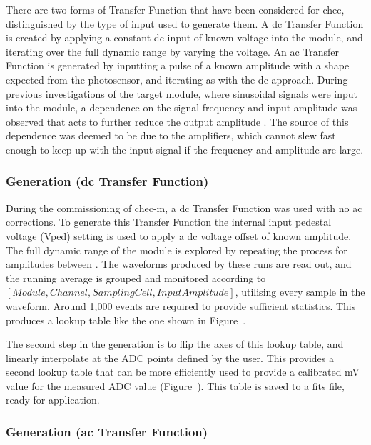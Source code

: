 There are two forms of Transfer Function that have been considered for \gls{chec}, distinguished by the type of input used to generate them. A \gls{dc} Transfer Function is created by applying a constant \gls{dc} input of known voltage into the module, and iterating over the full dynamic range by varying the voltage. An \gls{ac} Transfer Function is generated by inputting a pulse of a known amplitude with a shape expected from the photosensor, and iterating as with the \gls{dc} approach. During previous  investigations of the \gls{target} module, where sinusoidal signals were input into the module, a dependence on the signal frequency and input amplitude was observed that acts to further reduce the output amplitude \cite{Bechtol2012}\cite{Albert2017}. The source of this dependence was deemed to be due to the amplifiers, which cannot slew fast enough to keep up with the input
signal if the frequency and amplitude are large. 

\subsubsection{Generation (\gls{dc} Transfer Function)}

During the commissioning of \gls{chec-m}, a \gls{dc} Transfer Function was used with no \gls{ac} corrections. To generate this Transfer Function the internal input pedestal voltage (Vped) setting is used to apply a \gls{dc} voltage offset of known amplitude. The full dynamic range of the module is explored by repeating the process for amplitudes between . The waveforms produced by these runs are read out, and the running average is grouped and monitored according to $[Module, Channel, Sampling Cell, Input Amplitude]$, utilising every sample in the waveform. Around 1,000 events are required to provide sufficient statistics. This produces a lookup table like the one shown in Figure~.

The second step in the generation is to flip the axes of this lookup table, and linearly interpolate at the ADC points defined by the user. This provides a second lookup table that can be more efficiently used to provide a calibrated mV value for the measured ADC value (Figure~). This table is saved to a \gls{fits} file, ready for application.

\subsubsection{Generation (\gls{ac} Transfer Function)}

